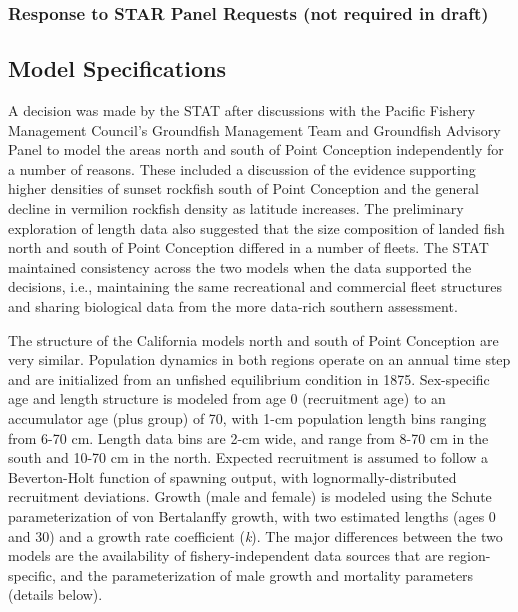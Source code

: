 \documentclass[
  english,
  a4paper,
]{article}
\begin{document}
\hypertarget{response-to-star-panel-requests-not-required-in-draft}{%
\subsubsection{Response to STAR Panel Requests (not required in draft)}\label{response-to-star-panel-requests-not-required-in-draft}}

\hypertarget{model-specifications}{%
\subsection{Model Specifications}\label{model-specifications}}

A decision was made by the STAT after discussions with the Pacific Fishery Management Council's Groundfish Management Team and Groundfish Advisory Panel to model the areas north and south of Point Conception independently for a number of reasons. These included a discussion of the evidence supporting higher densities of sunset rockfish south of Point Conception and the general decline in vermilion rockfish density as latitude increases. The preliminary exploration of length data also suggested that the size composition of landed fish north and south of Point Conception differed in a number of fleets. The STAT maintained consistency across the two models when the data supported the decisions, i.e., maintaining the same recreational and commercial fleet structures and sharing biological data from the more data-rich southern assessment.

The structure of the California models north and south of Point Conception are very similar. Population dynamics in both regions operate on an annual time step and are initialized from an unfished equilibrium condition in 1875. Sex-specific age and length structure is modeled from age 0 (recruitment age) to an accumulator age (plus group) of 70, with 1-cm population length bins ranging from 6-70 cm. Length data bins are 2-cm wide, and range from 8-70 cm in the south and 10-70 cm in the north. Expected recruitment is assumed to follow a Beverton-Holt function of spawning output, with lognormally-distributed recruitment deviations. Growth (male and female) is modeled using the Schute parameterization of von Bertalanffy growth, with two estimated lengths (ages 0 and 30) and a growth rate coefficient (\emph{k}). The major differences between the two models are the availability of fishery-independent data sources that are region-specific, and the parameterization of male growth and mortality parameters (details below).
\end{document}
